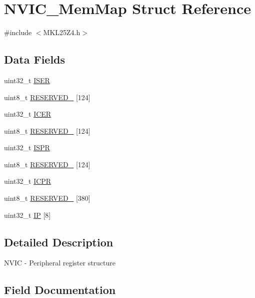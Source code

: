 \hypertarget{struct_n_v_i_c___mem_map}{}\section{N\+V\+I\+C\+\_\+\+Mem\+Map Struct Reference}
\label{struct_n_v_i_c___mem_map}


{\ttfamily \#include $<$M\+K\+L25\+Z4.\+h$>$}

\subsection*{Data Fields}
\begin{DoxyCompactItemize}
\item 
uint32\+\_\+t \hyperlink{struct_n_v_i_c___mem_map_aef94884a5cbb2f5260df2e30cf0c954f}{I\+S\+ER}
\item 
uint8\+\_\+t \hyperlink{struct_n_v_i_c___mem_map_a23a59a3d696222ce8eb7d473645fee33}{R\+E\+S\+E\+R\+V\+E\+D\+\_} \mbox{[}124\mbox{]}
\item 
uint32\+\_\+t \hyperlink{struct_n_v_i_c___mem_map_a60d6d4189f66d2ee451e0516db827fd1}{I\+C\+ER}
\item 
uint8\+\_\+t \hyperlink{struct_n_v_i_c___mem_map_a5916fcc22314a0bfd965e62b9fa733b7}{R\+E\+S\+E\+R\+V\+E\+D\+\_} \mbox{[}124\mbox{]}
\item 
uint32\+\_\+t \hyperlink{struct_n_v_i_c___mem_map_a9948e5816be3cb53ef9d27229eaf2d84}{I\+S\+PR}
\item 
uint8\+\_\+t \hyperlink{struct_n_v_i_c___mem_map_a53e744343069d137fd884b830e971004}{R\+E\+S\+E\+R\+V\+E\+D\+\_} \mbox{[}124\mbox{]}
\item 
uint32\+\_\+t \hyperlink{struct_n_v_i_c___mem_map_a2dcec5c8c1f5ce5c6121b5b718b1b685}{I\+C\+PR}
\item 
uint8\+\_\+t \hyperlink{struct_n_v_i_c___mem_map_a19f786736ec5a1004fb2811eacc76f13}{R\+E\+S\+E\+R\+V\+E\+D\+\_} \mbox{[}380\mbox{]}
\item 
uint32\+\_\+t \hyperlink{struct_n_v_i_c___mem_map_a1f22f7bba4536ada7f0655d30ac628d4}{IP} \mbox{[}8\mbox{]}
\end{DoxyCompactItemize}


\subsection{Detailed Description}
N\+V\+IC -\/ Peripheral register structure 

\subsection{Field Documentation}
\mbox{\label{struct_n_v_i_c___mem_map_a60d6d4189f66d2ee451e0516db827fd1}} 
